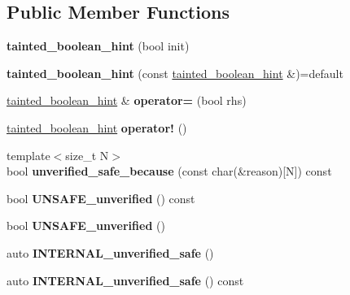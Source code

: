 \subsection*{Public Member Functions}
\begin{DoxyCompactItemize}
\item 
\mbox{\label{classrlbox_1_1tainted__boolean__hint_a14cea878f2d1cbf8722491cc0abe875f}} 
{\bfseries tainted\+\_\+boolean\+\_\+hint} (bool init)
\item 
\mbox{\label{classrlbox_1_1tainted__boolean__hint_adea514e39039a1278dc00b59ec911ce2}} 
{\bfseries tainted\+\_\+boolean\+\_\+hint} (const \hyperlink{classrlbox_1_1tainted__boolean__hint}{tainted\+\_\+boolean\+\_\+hint} \&)=default
\item 
\mbox{\label{classrlbox_1_1tainted__boolean__hint_accd26753a15b8c1510418a1b0ef6ac81}} 
\hyperlink{classrlbox_1_1tainted__boolean__hint}{tainted\+\_\+boolean\+\_\+hint} \& {\bfseries operator=} (bool rhs)
\item 
\mbox{\label{classrlbox_1_1tainted__boolean__hint_ae47718163139bbc69009f5d853700690}} 
\hyperlink{classrlbox_1_1tainted__boolean__hint}{tainted\+\_\+boolean\+\_\+hint} {\bfseries operator!} ()
\item 
\mbox{\label{classrlbox_1_1tainted__boolean__hint_abf39ef53dfd6b06017c127ef9370bb19}} 
{\footnotesize template$<$size\+\_\+t N$>$ }\\bool {\bfseries unverified\+\_\+safe\+\_\+because} (const char(\&reason)\mbox{[}N\mbox{]}) const
\item 
\mbox{\label{classrlbox_1_1tainted__boolean__hint_a6e23142c021bb326ab1d6d700a493b6f}} 
bool {\bfseries U\+N\+S\+A\+F\+E\+\_\+unverified} () const
\item 
\mbox{\label{classrlbox_1_1tainted__boolean__hint_a5bcd23163c04db9f85ee68a6e06ab57e}} 
bool {\bfseries U\+N\+S\+A\+F\+E\+\_\+unverified} ()
\item 
\mbox{\label{classrlbox_1_1tainted__boolean__hint_aa686dad271f4d9ed7e908d38313706d5}} 
auto {\bfseries I\+N\+T\+E\+R\+N\+A\+L\+\_\+unverified\+\_\+safe} ()
\item 
\mbox{\label{classrlbox_1_1tainted__boolean__hint_a6e329c5d66230f3d7af46482c84ba3a4}} 
auto {\bfseries I\+N\+T\+E\+R\+N\+A\+L\+\_\+unverified\+\_\+safe} () const
\end{DoxyCompactItemize}


